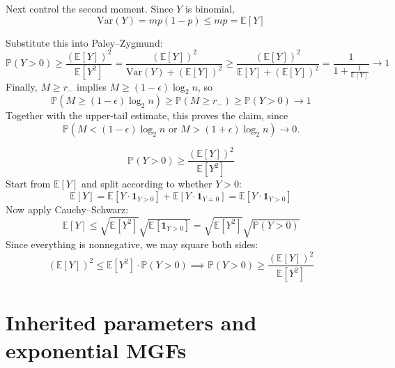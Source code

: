 Next control the second moment. Since $Y$ is binomial,
\begin{equation*}
    \text{Var}(Y) = mp(1 - p) \leq mp = \mathbb{E}[Y]
\end{equation*}

Substitute this into Paley–Zygmund:
\begin{equation*}
    \mathbb{P}(Y > 0) \geq \frac{(\mathbb{E}[Y])^{2}}{\mathbb{E}[Y^{2}]} = \frac{(\mathbb{E}[Y])^{2}}{\text{Var}(Y) + (\mathbb{E}[Y])^{2}}
            \geq \frac{(\mathbb{E}[Y])^{2}}{\mathbb{E}[Y] + (\mathbb{E}[Y])^{2}} = \frac{1}{1 + \frac{1}{\mathbb{E}[Y]}} \to 1
\end{equation*}
Finally, $M \geq r_{-}$ implies $M \geq (1 - \epsilon)\log_{2}n$, so
\begin{equation*}
    \mathbb{P}(M \geq (1 - \epsilon)\log_{2}n) \geq \mathbb{P}(M \geq r_{-}) \geq \mathbb{P}(Y > 0) \to 1
\end{equation*}
Together with the upper-tail estimate, this proves the claim, since
\begin{equation*}
    \mathbb{P}\left(M < (1-\epsilon)\log_2 n \text{ or } M > (1+\epsilon)\log_2 n\right) \to 0.
\end{equation*}

\begin{equation*}
    \mathbb{P}(Y > 0) \geq \frac{(\mathbb{E}[Y])^{2}}{\mathbb{E}[Y^{2}]}
\end{equation*}
Start from $\mathbb{E}[Y]$ and split according to whether $Y > 0$:
\begin{equation*}
    \mathbb{E}[Y] = \mathbb{E}[Y \cdot \mathbf{1}_{Y > 0}] + \mathbb{E}[Y \cdot \mathbf{1}_{Y = 0}] = \mathbb{E}[Y \cdot \mathbf{1}_{Y > 0}]
\end{equation*}
Now apply Cauchy–Schwarz:
\begin{equation*}
    \mathbb{E}[Y] \leq \sqrt{\mathbb{E}[Y^{2}]} \sqrt{\mathbb{E}[\mathbf{1}_{Y > 0}]} = \sqrt{\mathbb{E}[Y^{2}]} \sqrt{\mathbb{P}(Y > 0)}
\end{equation*}
Since everything is nonnegative, we may square both sides:
\begin{equation*}
    (\mathbb{E}[Y])^{2} \leq \mathbb{E}[Y^{2}] \cdot \mathbb{P}(Y > 0) \implies \mathbb{P}(Y > 0) \geq \frac{(\mathbb{E}[Y])^{2}}{\mathbb{E}[Y^{2}]}
\end{equation*}

\section{Inherited parameters and exponential MGFs}

